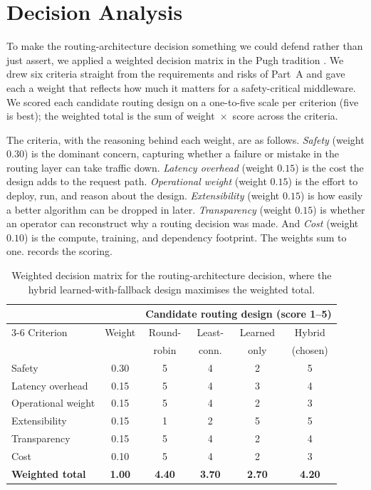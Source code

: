 \section{Decision Analysis}
\label{dsb:sec-decision}

To make the routing-architecture decision something we could defend rather than
just assert, we applied a weighted decision matrix in the Pugh tradition
\cite{pugh1991totaldesign}. We drew six criteria straight from the requirements
and risks of Part~A and gave each a weight that reflects how much it matters for
a safety-critical middleware. We scored each candidate routing design on a
one-to-five scale per criterion (five is best); the weighted total is the sum of
weight~$\times$~score across the criteria.

The criteria, with the reasoning behind each weight, are as follows.
\emph{Safety} (weight $0.30$) is the dominant concern, capturing whether a
failure or mistake in the routing layer can take traffic down. \emph{Latency
overhead} (weight $0.15$) is the cost the design adds to the request path.
\emph{Operational weight} (weight $0.15$) is the effort to deploy, run, and
reason about the design. \emph{Extensibility} (weight $0.15$) is how easily a
better algorithm can be dropped in later. \emph{Transparency} (weight $0.15$)
is whether an operator can reconstruct why a routing decision was made. And
\emph{Cost} (weight $0.10$) is the compute, training, and dependency footprint.
The weights sum to one.  records the scoring.

\begin{table}[H]
\centering
\caption[Weighted decision matrix for the routing architecture]{Weighted decision matrix for the routing-architecture decision, where the hybrid learned-with-fallback design maximises the weighted total.}
\label{dsb:tab:decision}
\small
\begin{tabular}{l c cccc}
\toprule
 & & \multicolumn{4}{c}{Candidate routing design (score 1--5)} \\
\cmidrule(lr){3-6}
Criterion & Weight & Round- & Least- & Learned & Hybrid \\
          &        & robin  & conn.  & only    & (chosen) \\
\midrule
Safety              & 0.30 & 5 & 4 & 2 & 5 \\
Latency overhead    & 0.15 & 5 & 4 & 3 & 4 \\
Operational weight  & 0.15 & 5 & 4 & 2 & 3 \\
Extensibility       & 0.15 & 1 & 2 & 5 & 5 \\
Transparency        & 0.15 & 5 & 4 & 2 & 4 \\
Cost                & 0.10 & 5 & 4 & 2 & 3 \\
\midrule
\textbf{Weighted total} & \textbf{1.00} & \textbf{4.40} & \textbf{3.70} & \textbf{2.70} & \textbf{4.20} \\
\bottomrule
\end{tabular}
\end{table}

